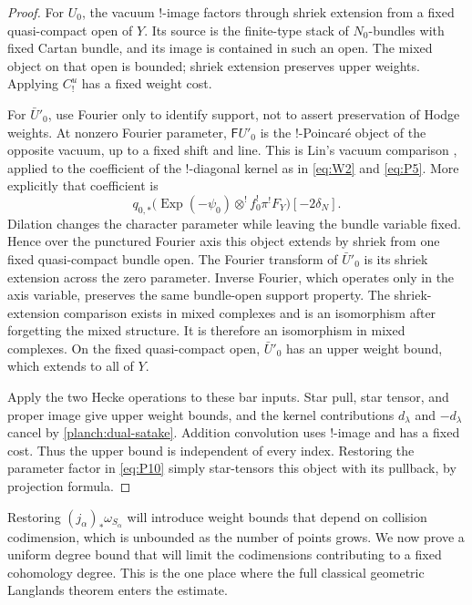 \begin{proof}
For $U_0$, the vacuum $!$-image factors through shriek extension from
a fixed quasi-compact open of $Y$.  Its source is the finite-type
stack of $N_0$-bundles with fixed Cartan bundle, and its image is
contained in such an open.  The mixed object on that open is bounded;
shriek extension preserves upper weights.  Applying $C_!^u$ has a
fixed weight cost.

For $\bar U'_0$, use Fourier only to identify support, not to assert
preservation of Hodge weights.  At nonzero Fourier parameter,
$\mathsf F U'_0$ is the $!$-Poincar\'e object of the opposite vacuum,
up to a fixed shift and line.  This is Lin's vacuum comparison
\cite[Theorem~9.0.2 and Section~8.1]{Lin}, applied to the coefficient
of the $!$-diagonal kernel as in \eqref{eq:W2} and \eqref{eq:P5}.
More explicitly that coefficient is
\[
 q_{0,*}\bigl(\operatorname{Exp}(-\psi_0)\otimes^!
                  f_0^!\pi^!F_Y\bigr)[-2\delta_N].
\]
Dilation changes the character parameter while leaving the bundle
variable fixed.  Hence over the punctured Fourier axis this object
extends by shriek from one fixed quasi-compact bundle open.
The Fourier transform of $\bar U'_0$ is its shriek extension across
the zero parameter.  Inverse Fourier, which operates only in the
axis variable, preserves the same bundle-open support property.
The shriek-extension comparison exists in mixed complexes and is an
isomorphism after forgetting the mixed structure.  It is therefore
an isomorphism in mixed complexes.  On the fixed quasi-compact open,
$\bar U'_0$ has an upper weight bound, which extends to all of $Y$.

Apply the two Hecke operations to these bar inputs.  Star pull,
star tensor, and proper image give upper weight bounds, and the
kernel contributions $d_\lambda$ and $-d_\lambda$ cancel by
\eqref{planch:dual-satake}.  Addition convolution uses $!$-image and
has a fixed cost.  Thus the upper bound is independent of every
index.  Restoring the parameter factor in \eqref{eq:P10} simply
star-tensors this object with its pullback, by projection formula.
\end{proof}

Restoring $(j_\alpha)_*\omega_{S_\alpha}$ will introduce weight bounds
that depend on collision codimension, which is unbounded as the number
of points grows.  We now prove a uniform degree bound that will limit
the codimensions contributing to a fixed cohomology degree.  This is
the one place where the full classical geometric Langlands theorem
enters the estimate.


